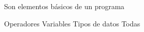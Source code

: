 
\question Son elementos básicos de un programa

  \begin{oneparchoices}
    \choice Operadores
    \choice Variables
    \choice Tipos de datos
    \CorrectChoice Todas
  \end{oneparchoices}
